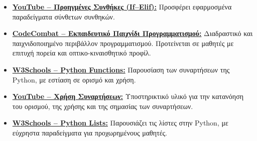 \documentclass[11pt]{report}
\begin{document}
\begin{itemize}
    \item \href{https://www.youtube.com/watch?v=23vCap6iYSs}{\textbf{YouTube – Προηγμένες Συνθήκες (If–Elif):}} Προσφέρει εφαρμοσμένα παραδείγματα σύνθετων συνθηκών.
    
    \item \href{https://codecombat.com/play}{\textbf{CodeCombat – Εκπαιδευτικό Παιχνίδι Προγραμματισμού:}} Διαδραστικό και παιχνιδοποιημένο περιβάλλον προγραμματισμού. Προτείνεται σε μαθητές με επιτυχή πορεία και οπτικο-κιναισθητικό προφίλ.
    
    \item \href{https://www.w3schools.com/python/python_functions.asp}{\textbf{W3Schools – Python Functions:}} Παρουσίαση των συναρτήσεων της Python, με εστίαση σε ορισμό και χρήση.
    
    \item \href{https://www.youtube.com/watch?v=NZMBVkTP3LA}{\textbf{YouTube – Χρήση Συναρτήσεων:}} Υποστηρικτικό υλικό για την κατανόηση του ορισμού, της χρήσης και της σημασίας των συναρτήσεων.
    
    \item \href{https://www.w3schools.com/python/python_lists.asp}{\textbf{W3Schools – Python Lists:}} Παρουσιάζει τις λίστες στην Python, με εύχρηστα παραδείγματα για προχωρημένους μαθητές.
\end{itemize}
\end{document}
